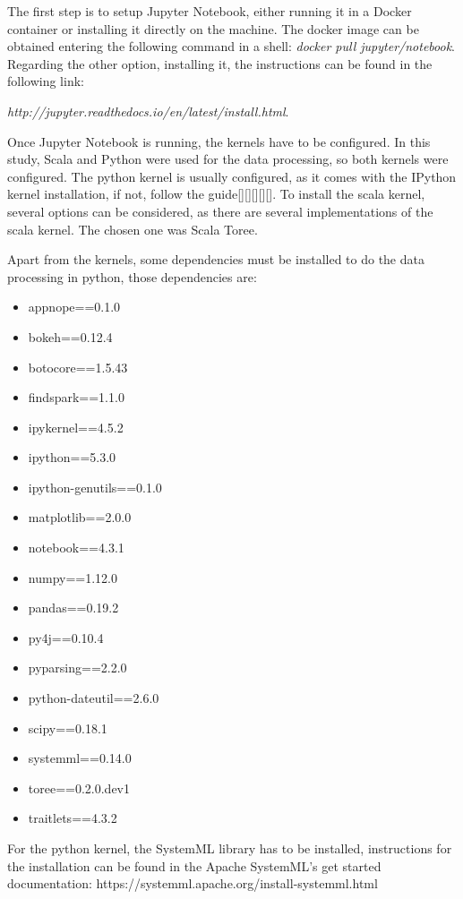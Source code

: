\documentclass[11pt]{book} %
\begin{document}
    The first step is to setup Jupyter Notebook, either running it in a Docker container or installing it directly on the machine. The docker image can be obtained entering the following command in a shell: \emph{docker pull jupyter/notebook}. Regarding the other option, installing it, the instructions can be found in the following link:

    \emph{http://jupyter.readthedocs.io/en/latest/install.html}.

    Once Jupyter Notebook is running, the kernels have to be configured. In this study, Scala and Python were used for the data processing, so both kernels were configured. The python kernel is usually configured, as it comes with the IPython kernel installation, if not, follow the guide[][][][][]. To install the scala kernel, several options can be considered, as there are several implementations of the scala kernel. The chosen one was Scala Toree.

    Apart from the kernels, some dependencies must be installed to do the data processing in python, those dependencies are:

    \begin{itemize}
      \item appnope==0.1.0
      \item bokeh==0.12.4
      \item botocore==1.5.43
      \item findspark==1.1.0
      \item ipykernel==4.5.2
      \item ipython==5.3.0
      \item ipython-genutils==0.1.0
      \item matplotlib==2.0.0
      \item notebook==4.3.1
      \item numpy==1.12.0
      \item pandas==0.19.2
      \item py4j==0.10.4
      \item pyparsing==2.2.0
      \item python-dateutil==2.6.0
      \item scipy==0.18.1
      \item systemml==0.14.0
      \item toree==0.2.0.dev1
      \item traitlets==4.3.2
    \end{itemize}

    For the python kernel, the SystemML library has to be installed, instructions for the installation can be found in the Apache SystemML's get started documentation: https://systemml.apache.org/install-systemml.html
\end{document}
